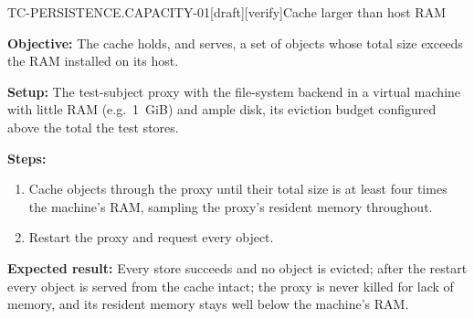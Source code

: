 \begin{requirement}{TC-PERSISTENCE.CAPACITY-01}[draft][verify]{Cache larger than host RAM}


  \textbf{Objective:} The cache holds, and serves, a set of objects whose total
  size exceeds the RAM installed on its host.

  \textbf{Setup:} The test-subject proxy with the file-system backend in a
  virtual machine with little RAM (e.g.\ 1~GiB) and ample disk, its eviction
  budget configured above the total the test stores.

  \textbf{Steps:}
  \begin{enumerate}
    \item Cache objects through the proxy until their total size is at least
      four times the machine's RAM, sampling the proxy's resident memory
      throughout.
    \item Restart the proxy and request every object.
  \end{enumerate}

  \textbf{Expected result:} Every store succeeds and no object is evicted;
  after the restart every object is served from the cache intact; the proxy is
  never killed for lack of memory, and its resident memory stays well below
  the machine's RAM.



\end{requirement}


